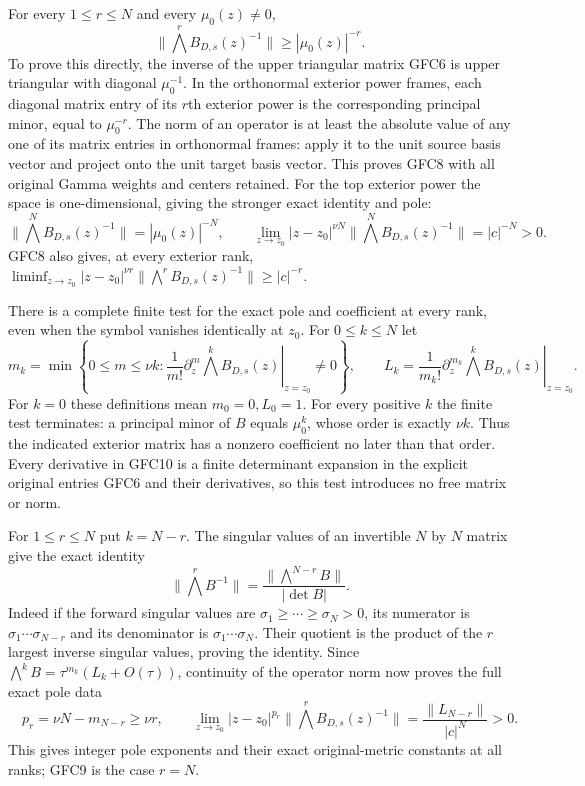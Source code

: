 For every $1\le r\le N$ and every $\mu_0(z)\ne0$,
\[
 \boxed{\qquad
 \|\bigwedge^r B_{D,s}(z)^{-1}\|
                \ge |\mu_0(z)|^{-r}.
 \qquad}\tag{GFC8}
\]
To prove this directly, the inverse of the upper triangular matrix
GFC6 is upper triangular with diagonal $\mu_0^{-1}$.
In the orthonormal exterior power frames, each diagonal matrix entry
of its $r$th exterior power is the corresponding principal minor,
equal to $\mu_0^{-r}$. The norm of an operator is at least the
absolute value of any one of its matrix entries in orthonormal
frames: apply it to the unit source basis vector and project onto
the unit target basis vector. This proves GFC8 with all original
Gamma weights and centers retained.
For the top exterior power the space is one-dimensional, giving
the stronger exact identity and pole:
\[
 \|\bigwedge^N B_{D,s}(z)^{-1}\|=|\mu_0(z)|^{-N},\qquad
 \lim_{z\to z_0}|z-z_0|^{\nu N}
       \|\bigwedge^N B_{D,s}(z)^{-1}\|=|c|^{-N}>0.
 \tag{GFC9}
\]
GFC8 also gives, at every exterior rank,
$\liminf_{z\to z_0}|z-z_0|^{\nu r}
\|\bigwedge^rB_{D,s}(z)^{-1}\|\ge|c|^{-r}$.

There is a complete finite test for the exact pole and coefficient at
every rank, even when the symbol vanishes identically at $z_0$.
For $0\le k\le N$ let
\[
 m_k=\min\left\{0\le m\le\nu k:
     \left.\frac1{m!}\partial_z^m\bigwedge^kB_{D,s}(z)
          \right|_{z=z_0}\ne0\right\},\qquad
 L_k=\left.\frac1{m_k!}\partial_z^{m_k}
                  \bigwedge^kB_{D,s}(z)\right|_{z=z_0}.
 \tag{GFC10}
\]
For $k=0$ these definitions mean $m_0=0,L_0=1$.
For every positive $k$ the finite test terminates: a principal minor
of $B$ equals $\mu_0^k$, whose order is exactly $\nu k$.
Thus the indicated exterior matrix has a nonzero coefficient no
later than that order. Every derivative in GFC10 is a finite
determinant expansion in the explicit original entries GFC6 and
their derivatives, so this test introduces no free matrix or norm.

For $1\le r\le N$ put $k=N-r$. The singular values of an
invertible $N$ by $N$ matrix give the exact identity
\[
 \|\bigwedge^rB^{-1}\|
       =\frac{\|\bigwedge^{N-r}B\|}{|\det B|}.
 \tag{GFC11}
\]
Indeed if the forward singular values are
$\sigma_1\ge\cdots\ge\sigma_N>0$, its numerator is
$\sigma_1\cdots\sigma_{N-r}$ and its denominator is
$\sigma_1\cdots\sigma_N$. Their quotient is the product of
the $r$ largest inverse singular values, proving the identity.
Since $\bigwedge^kB=\tau^{m_k}(L_k+O(\tau))$, continuity
of the operator norm now proves the full exact pole data
\[
 \boxed{\quad
 p_r=\nu N-m_{N-r}\ge\nu r,\qquad
 \lim_{z\to z_0}|z-z_0|^{p_r}
       \|\bigwedge^rB_{D,s}(z)^{-1}\|
       =\frac{\|L_{N-r}\|}{|c|^N}>0.
 \quad}\tag{GFC12}
\]
This gives integer pole exponents and their exact original-metric
constants at all ranks; GFC9 is the case $r=N$.

